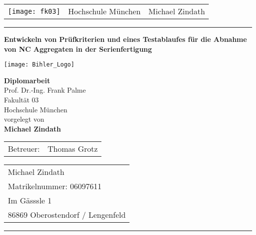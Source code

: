 
\newcommand{\trtitle}{Entwickeln von Prüfkriterien und eines Testablaufes für die Abnahme von NC Aggregaten in der Serienfertigung}
\newcommand{\trtype}{Diplomarbeit}
\newcommand{\trauthor}{Michael Zindath}
\newcommand{\trstrasse}{Im Gässsle 1}
\newcommand{\trmatrikelnummer}{06097611}
\newcommand{\trort}{86869 Oberostendorf / Lengenfeld}
\newcommand{\trprof}{Prof. Dr.-Ing. Frank Palme}
\newcommand{\trbetreuer}{Thomas Grotz}
\newcommand{\trfachgebiet}{XXXX}
\newcommand{\trfakultaet}{Fakultät 03}
\newcommand{\truni}{Hochschule München}
\newcommand{\trdate}{\today}

\thispagestyle{empty}

\begin{tabular}{lcr}
  \texttt{[image: fk03]} & %
  \hspace{1.5cm} \truni \hspace{1cm} &
  \trauthor
  \\
\end{tabular}

\rule{\textwidth}{0.8pt}

\vspace{1cm}
\begin{center}
  \textbf{\LARGE \trtitle}
\end{center}


\begin{center}
\texttt{[image: Bihler\_Logo]} %
\\
\end{center}

\begin{center}
  \textbf{\trtype} \\
  \trprof \\
  
  \trfakultaet \\
  \truni \\[0.5cm]
  vorgelegt von \\
  \textbf{\trauthor}
\end{center}

\vspace{1cm}



\begin{center}
\begin{tabular}{ll}
Betreuer: & \trbetreuer \\
\end{tabular}
\end{center}


\vfill

\begin{tabular}{l}
\trauthor \\
Matrikelnummer:  \trmatrikelnummer \\
\trstrasse \\
\trort
\end{tabular}

\rule{\textwidth}{0.4pt}